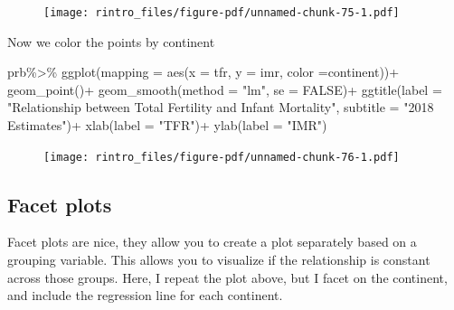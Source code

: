 \documentclass[
  letterpaper,
  DIV=11,
  numbers=noendperiod]{scrreprt}
\newenvironment{Shaded}{\begin{snugshade}}{\end{snugshade}}
\newcommand{\AttributeTok}[1]{\textcolor[rgb]{0.40,0.45,0.13}{#1}}
\newcommand{\ConstantTok}[1]{\textcolor[rgb]{0.56,0.35,0.01}{#1}}
\newcommand{\FunctionTok}[1]{\textcolor[rgb]{0.28,0.35,0.67}{#1}}
\newcommand{\NormalTok}[1]{\textcolor[rgb]{0.00,0.23,0.31}{#1}}
\newcommand{\SpecialCharTok}[1]{\textcolor[rgb]{0.37,0.37,0.37}{#1}}
\newcommand{\StringTok}[1]{\textcolor[rgb]{0.13,0.47,0.30}{#1}}
\begin{document}
\begin{figure}[H]

{\centering \texttt{[image: rintro\_files/figure-pdf/unnamed-chunk-75-1.pdf]}

}

\end{figure}

Now we color the points by continent

\begin{Shaded}
\begin{Highlighting}[]
\NormalTok{prb}\SpecialCharTok{\%\textgreater{}\%}
\FunctionTok{ggplot}\NormalTok{(}\AttributeTok{mapping =} \FunctionTok{aes}\NormalTok{(}\AttributeTok{x =}\NormalTok{ tfr, }
                     \AttributeTok{y =}\NormalTok{ imr,}
                     \AttributeTok{color =}\NormalTok{continent))}\SpecialCharTok{+}
  \FunctionTok{geom\_point}\NormalTok{()}\SpecialCharTok{+}
  \FunctionTok{geom\_smooth}\NormalTok{(}\AttributeTok{method =} \StringTok{"lm"}\NormalTok{,}
              \AttributeTok{se =} \ConstantTok{FALSE}\NormalTok{)}\SpecialCharTok{+}
  \FunctionTok{ggtitle}\NormalTok{(}\AttributeTok{label =} \StringTok{"Relationship between Total Fertility and Infant Mortality"}\NormalTok{,}
          \AttributeTok{subtitle =} \StringTok{"2018 Estimates"}\NormalTok{)}\SpecialCharTok{+}
  \FunctionTok{xlab}\NormalTok{(}\AttributeTok{label =} \StringTok{"TFR"}\NormalTok{)}\SpecialCharTok{+}
  \FunctionTok{ylab}\NormalTok{(}\AttributeTok{label =} \StringTok{"IMR"}\NormalTok{)}
\end{Highlighting}
\end{Shaded}

\begin{figure}[H]

{\centering \texttt{[image: rintro\_files/figure-pdf/unnamed-chunk-76-1.pdf]}

}

\end{figure}

\hypertarget{facet-plots}{%
\subsection{Facet plots}\label{facet-plots}}

Facet plots are nice, they allow you to create a plot separately based
on a grouping variable. This allows you to visualize if the relationship
is constant across those groups. Here, I repeat the plot above, but I
facet on the continent, and include the regression line for each
continent.
\end{document}
